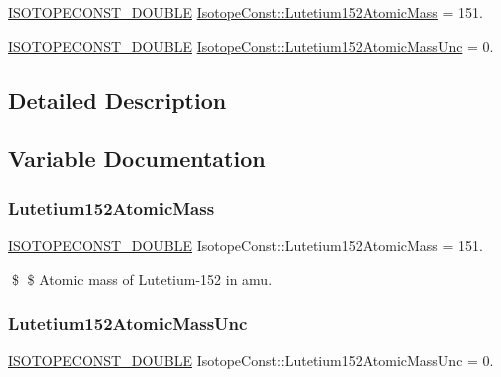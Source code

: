 \begin{DoxyCompactItemize}
\item 
\mbox{\hyperlink{group___isotope_const-_macros_ga8f45a7272ce02c0b4c65c44636ed719a}{I\+S\+O\+T\+O\+P\+E\+C\+O\+N\+S\+T\+\_\+\+D\+O\+U\+B\+LE}} \mbox{\hyperlink{group___isotope_const-_lutetium-_lu152_ga1a0596255dbef38fa96b3c8a257a0a2e}{Isotope\+Const\+::\+Lutetium152\+Atomic\+Mass}} = 151.
\item 
\mbox{\hyperlink{group___isotope_const-_macros_ga8f45a7272ce02c0b4c65c44636ed719a}{I\+S\+O\+T\+O\+P\+E\+C\+O\+N\+S\+T\+\_\+\+D\+O\+U\+B\+LE}} \mbox{\hyperlink{group___isotope_const-_lutetium-_lu152_ga711994d8d48c60c023d7152549ea3fb8}{Isotope\+Const\+::\+Lutetium152\+Atomic\+Mass\+Unc}} = 0.
\end{DoxyCompactItemize}


\subsection{Detailed Description}


\subsection{Variable Documentation}
\mbox{\label{group___isotope_const-_lutetium-_lu152_ga1a0596255dbef38fa96b3c8a257a0a2e}} 
\subsubsection{\texorpdfstring{Lutetium152\+Atomic\+Mass}{Lutetium152AtomicMass}}
{\footnotesize\ttfamily \mbox{\hyperlink{group___isotope_const-_macros_ga8f45a7272ce02c0b4c65c44636ed719a}{I\+S\+O\+T\+O\+P\+E\+C\+O\+N\+S\+T\+\_\+\+D\+O\+U\+B\+LE}} Isotope\+Const\+::\+Lutetium152\+Atomic\+Mass = 151.}

\$ \$ Atomic mass of Lutetium-\/152 in amu. \mbox{\label{group___isotope_const-_lutetium-_lu152_ga711994d8d48c60c023d7152549ea3fb8}} 
\subsubsection{\texorpdfstring{Lutetium152\+Atomic\+Mass\+Unc}{Lutetium152AtomicMassUnc}}
{\footnotesize\ttfamily \mbox{\hyperlink{group___isotope_const-_macros_ga8f45a7272ce02c0b4c65c44636ed719a}{I\+S\+O\+T\+O\+P\+E\+C\+O\+N\+S\+T\+\_\+\+D\+O\+U\+B\+LE}} Isotope\+Const\+::\+Lutetium152\+Atomic\+Mass\+Unc = 0.}

